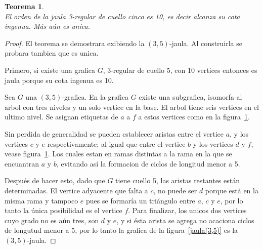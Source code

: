 \documentclass[12pt]{book}
\newtheorem{theorem}{Teorema}
\theoremstyle{definition}
\begin{document}
\begin{theorem}\textbf{}\\\label{teo(3,5)-jaula}
El orden de la jaula 3-regular de cuello cinco es 10, es decir alcanza
su cota ingenua. Más aún es unica. 
\end{theorem}

\begin{proof}
El teorema se demostrara exibiendo la $(3,5)$-jaula. Al construirla se
probara tambien que es unica. 

Primero, si existe una grafica $G$, 3-regular de cuello 5, con 10 vertices
entonces es jaula porque su cota ingenua es 10. 

Sea $G$ una $(3,5)$-grafica. En la grafica  $G$ existe una subgrafica,
isomorfa al arbol con tres niveles y un solo vertice en la base. El
arbol tiene seis vertices en el ultimo nivel. Se asignan etiquetas de
$a$ a $f$ a estos vertices como en la figura~\ref{arbol(3,5)}.


Sin perdida de generalidad se pueden establecer aristas entre el vertice $a$, y los
vertices $c$ y $e$ respectivamente; al igual que entre el vertice $b$
y los vertices $d$ y $f$, vease figura~\ref{arbol(3,5)}. Los cuales estan en ramas
distintas a la rama en la que se encuantran $a$ y $b$, evitando así la formacion de ciclos de longitud menor a 5.


\begin{figure}[htb]
  \centering
  \caption{} \label{arbol(3,5)}
\end{figure}

Después de hacer esto, dado que $G$ tiene cuello 5, las aristas restantes están
determinadas. El vertice adyacente que falta a $c$, no puede ser $d$
porque está en la misma rama y tampoco $e$ pues se formaría un triángulo entre $a$, $c$ y
$e$, por lo tanto la única posibilidad es el vertice $f$. Para
finalizar, los unicos dos vertices cuyo grado no es aún tres, son $d$
y $e$, y si ésta arista se agrega no acaciona ciclos de longutud menor a
5, por lo tanto la grafica de la figura~\ref{jaula(3,5)} es la $(3,5)$-jaula.


\end{proof}
\end{document}
